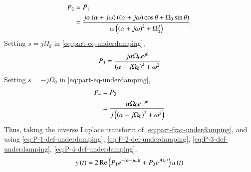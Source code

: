 \documentclass[journal,12pt,twocolumn]{IEEEtran}
\begin{document}
\begin{enumerate}[label=\theenumi.]
\begin{enumerate}
\begin{align}
            P_2 &= \bar{P_1} \\
                &= \frac{j\alpha\left(\alpha+j\omega\right)\left(\left(\alpha+j\omega\right)\cos\theta+\Omega_0\sin\theta\right)}{\omega\left(\left(\alpha+j\omega\right)^2+\Omega_0^2\right)}.
            \label{eq:P-2-def-underdamping}
        \end{align}
        Setting \(s = j\Omega_0\) in \eqref{eq:part-eq-underdamping},
        \begin{equation}
            P_3 = \frac{j\alpha\Omega_0e^{j\theta}}{\left(\alpha+j\Omega_0\right)^2+\omega^2}
            \label{eq:P-3-def-underdamping}
        \end{equation}
        Setting \(s = -j\Omega_0\) in \eqref{eq:part-eq-underdamping},
        \begin{align}
            P_4 &= \bar{P_3} \\
                &= \frac{\alpha\Omega_0e^{-j\theta}}{j\left(\left(\alpha-j\Omega_0\right)^2+\omega^2\right)}
            \label{eq:P-4-def-underdamping}
        \end{align}
        Thus, taking the inverse Laplace transform of
        \eqref{eq:part-frac-underdamping}, and using
        \eqref{eq:P-1-def-underdamping}, \eqref{eq:P-2-def-underdamping},
        \eqref{eq:P-3-def-underdamping}, \eqref{eq:P-4-def-underdamping},
        \begin{equation}
            y\left(t\right) = 2\mathop{\mathrm{Re}}\left(P_1e^{-\left(\alpha-j\omega\right)t}+P_3e^{j\Omega_0t}\right)u\left(t\right)
            \label{eq:y-t-cos-underdamping}
        \end{equation}


\end{enumerate}
\end{enumerate}
\end{document}
